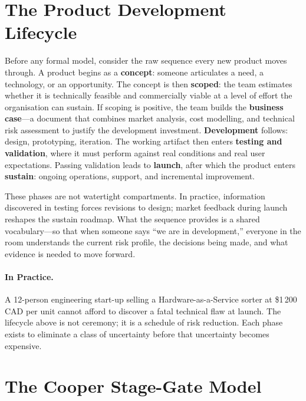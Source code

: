 \section{The Product Development Lifecycle}
\label{sec:ch2-lifecycle}

Before any formal model, consider the raw sequence every new product
moves through.
A product begins as a \textbf{concept}: someone articulates a need, a
technology, or an opportunity.
The concept is then \textbf{scoped}: the team estimates whether it is
technically feasible and commercially viable at a level of effort the
organisation can sustain.
If scoping is positive, the team builds the \textbf{business case}---a
document that combines market analysis, cost modelling, and technical
risk assessment to justify the development investment.
\textbf{Development} follows: design, prototyping, iteration.
The working artifact then enters \textbf{testing and validation}, where
it must perform against real conditions and real user expectations.
Passing validation leads to \textbf{launch}, after which the product
enters \textbf{sustain}: ongoing operations, support, and incremental
improvement.

These phases are not watertight compartments.
In practice, information discovered in testing forces revisions to design;
market feedback during launch reshapes the sustain roadmap.
What the sequence provides is a shared vocabulary---so that when someone
says ``we are in development,'' everyone in the room understands the
current risk profile, the decisions being made, and what evidence is
needed to move forward.

\paragraph{In Practice.}
A 12-person engineering start-up selling a Hardware-as-a-Service sorter at
\$1\,200\,CAD per unit cannot afford to discover a fatal technical flaw at
launch.
The lifecycle above is not ceremony; it is a schedule of risk reduction.
Each phase exists to eliminate a class of uncertainty before that
uncertainty becomes expensive.

\section{The Cooper Stage-Gate Model}
\label{sec:ch2-stagegate}

